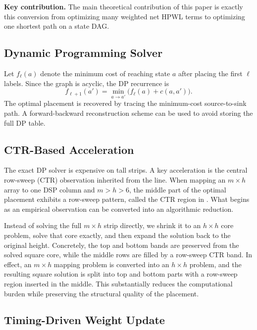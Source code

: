 \textbf{Key contribution.}
The main theoretical contribution of this paper is exactly this conversion from optimizing many weighted net HPWL terms to optimizing one shortest path on a state DAG.

\subsection{Dynamic Programming Solver}

Let $f_\ell(a)$ denote the minimum cost of reaching state $a$ after placing the first $\ell$ labels. Since the graph is acyclic, the DP recurrence is
\begin{equation}
f_{\ell+1}(a') = \min_{a \to a'} \bigl(f_\ell(a) + c(a,a')\bigr).
\label{eq:dp}
\end{equation}
The optimal placement is recovered by tracing the minimum-cost source-to-sink path. A forward-backward reconstruction scheme can be used to avoid storing the full DP table.

\subsection{CTR-Based Acceleration}

The exact DP solver is expensive on tall strips. A key acceleration is the central row-sweep (CTR) observation inherited from the \rsad line. When mapping an $m \times h$ array to one DSP column and $m > h > 6$, the middle part of the optimal placement exhibits a row-sweep pattern, called the CTR region in \rsad. What begins as an empirical observation can be converted into an algorithmic reduction.

Instead of solving the full $m \times h$ strip directly, we shrink it to an $h \times h$ core problem, solve that core exactly, and then expand the solution back to the original height. Concretely, the top and bottom bands are preserved from the solved square core, while the middle rows are filled by a row-sweep CTR band. In effect, an $m \times h$ mapping problem is converted into an $h \times h$ problem, and the resulting square solution is split into top and bottom parts with a row-sweep region inserted in the middle. This substantially reduces the computational burden while preserving the structural quality of the placement.

\subsection{Timing-Driven Weight Update}

